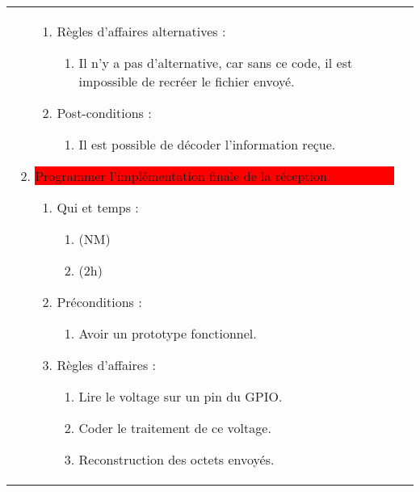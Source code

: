 \begin{longtable}{|l|p{}|}
\begin{enumerate}[label*=\arabic*.]
\begin{enumerate}[label*=\arabic*.]
                                \item Règles d'affaires alternatives :
                                \begin{enumerate}[label*=\arabic*.]
                                    \item Il n'y a pas d'alternative, car sans ce code, il est impossible de recréer le fichier envoyé.
                                \end{enumerate}
                                \item Post-conditions :
                                \begin{enumerate}[label*=\arabic*.]
                                    \item Il est possible de décoder l'information reçue.
                                \end{enumerate}
                            \end{enumerate}
            \item \colorbox{Red}{\parbox{13cm}{Programmer l'implémentation finale de la réception.}}
                            \begin{enumerate}[label*=\arabic*.]
                                \item Qui et temps :
                                \begin{enumerate}[label*=\arabic*.]
                                    \item (NM)
                                    \item (2h)
                                \end{enumerate}
                                \item Préconditions :
                                \begin{enumerate}[label*=\arabic*.]
                                    \item Avoir un prototype fonctionnel.
                                \end{enumerate}
                                \item Règles d'affaires :
                                \begin{enumerate}[label*=\arabic*.]
                                    \item Lire le voltage sur un pin du GPIO.
                                    \item Coder le traitement de ce voltage.
                                    \item Reconstruction des octets envoyés.

\end{enumerate}
\end{enumerate}
\end{enumerate}
\end{longtable}
